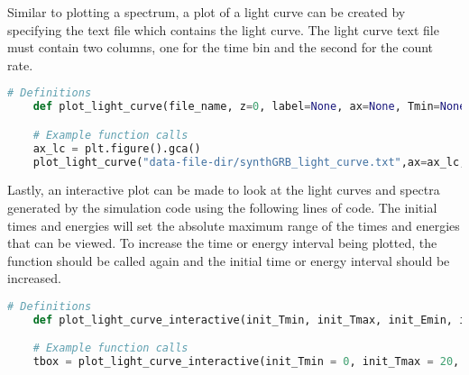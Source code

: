 \documentclass[linenumbers]{aastex631}
\begin{document}
Similar to plotting a spectrum, a plot of a light curve can be created by specifying the text file which contains the light curve. The light curve text file must contain two columns, one for the time bin and the second for the count rate. 

\begin{lstlisting}[language = Python, caption = Plotting Light Curves, label={lst: plot light curves}]
    # Definitions
    def plot_light_curve(file_name, z=0, label=None, ax=None, Tmin=None, Tmax=None, save_pref=None,color="C0", fontsize=14,fontweight='bold', logscale=False)

    # Example function calls
    ax_lc = plt.figure().gca()
    plot_light_curve("data-file-dir/synthGRB_light_curve.txt",ax=ax_lc,z=z,label="Total",logscale=False,color="k")
\end{lstlisting}

Lastly, an interactive plot can be made to look at the light curves and spectra generated by the simulation code using the following lines of code. The initial times and energies will set the absolute maximum range of the times and energies that can be viewed. To increase the time or energy interval being plotted, the function should be called again and the initial time or energy interval should be increased. 

\begin{lstlisting}[language = Python, caption = Plotting Interactive Synthetic Spectra/Light Curves, label={lst: plot interactive }]
    # Definitions
    def plot_light_curve_interactive(init_Tmin, init_Tmax, init_Emin, init_Emax, z=0, with_comps=False, label=None, ax=None, save_pref=None, fontsize=14,fontweight='bold',logscale=False)

    # Example function calls
    tbox = plot_light_curve_interactive(init_Tmin = 0, init_Tmax = 20, init_Emin = 8, init_Emax = 1e4,z=z,label="Total",with_comps=True)
\end{lstlisting}

\newpage


\end{document}
